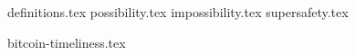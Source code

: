 
{definitions.tex}
{possibility.tex}
{impossibility.tex}
{supersafety.tex}


{bitcoin-timeliness.tex}
